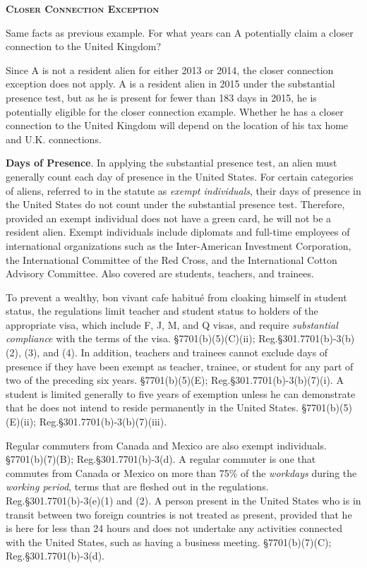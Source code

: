 	\begin{framed}	
		\begin{center}
			\textsc{\textbf{Closer Connection Exception}}
		\end{center}
Same facts as previous example.  For what years can A potentially claim a closer connection to the United Kingdom?  

Since A is not a resident alien for either 2013 or 2014, the closer connection exception does not apply.  A is a resident alien in 2015 under the substantial presence test, but as he is present for fewer than 183 days in 2015, he is potentially eligible for the closer connection example.  Whether he has a closer connection to the United Kingdom will depend on the location of his tax home and U.K. connections.
	\end{framed}
	
	\textbf{Days of Presence}.  In applying the substantial presence test, an alien must generally count each day of presence in the United States.  For certain categories of aliens, referred to in the statute as \emph{exempt individuals}, their days of presence in the United States do not count under the substantial presence test.  Therefore, provided an exempt individual does not have a green card, he will not be a resident alien.  Exempt individuals include diplomats and full-time employees of international organizations such as the Inter-American Investment Corporation, the International Committee of the Red Cross, and the International Cotton Advisory Committee.  Also covered are students, teachers, and trainees.  

To prevent a wealthy, bon vivant cafe habitu\'{e} from cloaking himself in student status, the regulations limit teacher and student status to holders of the appropriate visa, which include F, J, M, and Q visas, and require \textit{substantial compliance} with the terms of the visa.   \S7701(b)(5)(C)(ii); Reg.\@ \S301.7701(b)-3(b)(2), (3), and (4).  In addition, teachers and trainees cannot exclude days of presence if they have been exempt as teacher, trainee, or student for any part of two of the preceding six years.  \S7701(b)(5)(E); Reg.\@ \S301.7701(b)-3(b)(7)(i).  A student is limited generally to five years of exemption unless he can demonstrate that he does not intend to reside permanently in the United States.  \S7701(b)(5)(E)(ii); Reg.\@ \S301.7701(b)-3(b)(7)(iii).   

Regular commuters from Canada and Mexico are also exempt individuals.  \S7701(b)(7)(B);  Reg.\@ \S301.7701(b)-3(d).  A regular commuter is one that commutes from Canada or Mexico on more than 75\% of the \emph{workdays} during the \emph{working period}, terms that are fleshed out in the regulations.  Reg.\@ \S301.7701(b)-3(e)(1) and (2).  A person present in the United States who is in transit between two foreign countries is not treated as present, provided that he is here for less than 24 hours and does not undertake any activities connected with the United States, such as having a business meeting.  \S7701(b)(7)(C); Reg.\@ \S301.7701(b)-3(d).   

